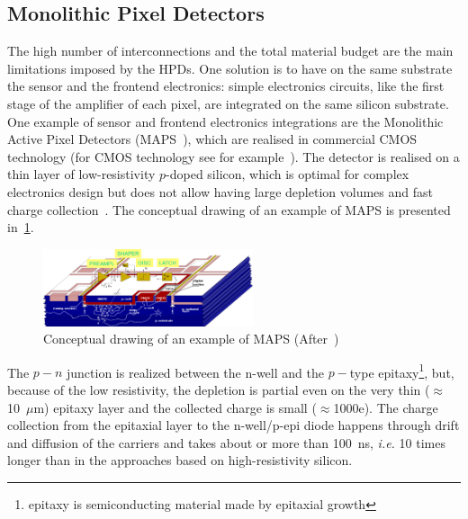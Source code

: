 \subsection{Monolithic Pixel Detectors}
\label{sec:MAPS}
The high number of interconnections and the total material budget are the main limitations imposed 
by the HPDs. One solution is to have on the same substrate the sensor and the  frontend electronics: 
 simple electronics circuits, like the first stage of the amplifier of each pixel, are integrated on the 
 same silicon substrate. 
 One example of sensor and frontend electronics integrations are the Monolithic Active Pixel Detectors 
 (MAPS~\cite{CLAUS2001120}), which are realised  in  
 commercial CMOS technology (for CMOS technology see for example~\cite{Lutz:411172}).  
 The detector is realised on a thin layer of low-resistivity $p$-doped silicon, which is optimal for complex 
 electronics design but does not allow having large depletion volumes and fast charge 
 collection~\cite{rossi2006pixel}. The conceptual drawing of an example of MAPS is presented 
 in~\ref{fig:maps}.
 \begin{figure}[htbp]
   \centering
  \includegraphics[width=0.55\textwidth]{maps.pdf} 
      \caption{\label{fig:maps} Conceptual drawing of an example of MAPS (After~\cite{ReApsel})}
\end{figure}
The $p-n$ junction is realized between the n-well and the $p-$type epitaxy\footnote{epitaxy is 
semiconducting material made by epitaxial growth}, but, because of the low resistivity, the depletion is 
partial even on the very thin ($\approx$10~$\mu$m) epitaxy layer and the collected charge is small 
($\approx$1000e). The 
charge collection from the epitaxial layer to the n-well/p-epi diode happens through drift and diffusion of 
the carriers and takes about or more than 100~ns, {\it i.e.} 10 times longer than in the approaches based on 
high-resistivity silicon.


